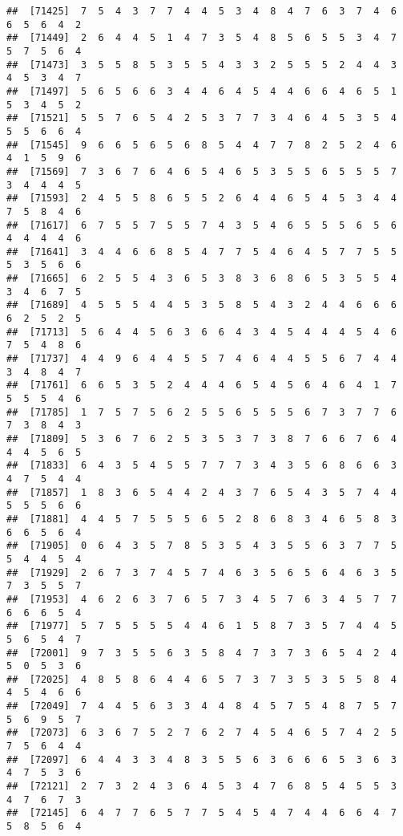 \documentclass[
]{book}
\begin{document}
\begin{verbatim}
##  [71425]  7  5  4  3  7  7  4  4  5  3  4  8  4  7  6  3  7  4  6  6  5  6  4  2
##  [71449]  2  6  4  4  5  1  4  7  3  5  4  8  5  6  5  5  3  4  7  5  7  5  6  4
##  [71473]  3  5  5  8  5  3  5  5  4  3  3  2  5  5  5  2  4  4  3  4  5  3  4  7
##  [71497]  5  6  5  6  6  3  4  4  6  4  5  4  4  6  6  4  6  5  1  5  3  4  5  2
##  [71521]  5  5  7  6  5  4  2  5  3  7  7  3  4  6  4  5  3  5  4  5  5  6  6  4
##  [71545]  9  6  6  5  6  5  6  8  5  4  4  7  7  8  2  5  2  4  6  4  1  5  9  6
##  [71569]  7  3  6  7  6  4  6  5  4  6  5  3  5  5  6  5  5  5  7  3  4  4  4  5
##  [71593]  2  4  5  5  8  6  5  5  2  6  4  4  6  5  4  5  3  4  4  7  5  8  4  6
##  [71617]  6  7  5  5  7  5  5  7  4  3  5  4  6  5  5  5  6  5  6  4  4  4  4  6
##  [71641]  3  4  4  6  6  8  5  4  7  7  5  4  6  4  5  7  7  5  5  5  3  5  6  6
##  [71665]  6  2  5  5  4  3  6  5  3  8  3  6  8  6  5  3  5  5  4  3  4  6  7  5
##  [71689]  4  5  5  5  4  4  5  3  5  8  5  4  3  2  4  4  6  6  6  6  2  5  2  5
##  [71713]  5  6  4  4  5  6  3  6  6  4  3  4  5  4  4  4  5  4  6  7  5  4  8  6
##  [71737]  4  4  9  6  4  4  5  5  7  4  6  4  4  5  5  6  7  4  4  3  4  8  4  7
##  [71761]  6  6  5  3  5  2  4  4  4  6  5  4  5  6  4  6  4  1  7  5  5  5  4  6
##  [71785]  1  7  5  7  5  6  2  5  5  6  5  5  5  6  7  3  7  7  6  7  3  8  4  3
##  [71809]  5  3  6  7  6  2  5  3  5  3  7  3  8  7  6  6  7  6  4  4  4  5  6  5
##  [71833]  6  4  3  5  4  5  5  7  7  7  3  4  3  5  6  8  6  6  3  4  7  5  4  4
##  [71857]  1  8  3  6  5  4  4  2  4  3  7  6  5  4  3  5  7  4  4  5  5  5  6  6
##  [71881]  4  4  5  7  5  5  5  6  5  2  8  6  8  3  4  6  5  8  3  6  6  5  6  4
##  [71905]  0  6  4  3  5  7  8  5  3  5  4  3  5  5  6  3  7  7  5  5  4  4  5  4
##  [71929]  2  6  7  3  7  4  5  7  4  6  3  5  6  5  6  4  6  3  5  7  3  5  5  7
##  [71953]  4  6  2  6  3  7  6  5  7  3  4  5  7  6  3  4  5  7  7  6  6  6  5  4
##  [71977]  5  7  5  5  5  5  4  4  6  1  5  8  7  3  5  7  4  4  5  5  6  5  4  7
##  [72001]  9  7  3  5  5  6  3  5  8  4  7  3  7  3  6  5  4  2  4  5  0  5  3  6
##  [72025]  4  8  5  8  6  4  4  6  5  7  3  7  3  5  3  5  5  8  4  4  5  4  6  6
##  [72049]  7  4  4  5  6  3  3  4  4  8  4  5  7  5  4  8  7  5  7  5  6  9  5  7
##  [72073]  6  3  6  7  5  2  7  6  2  7  4  5  4  6  5  7  4  2  5  7  5  6  4  4
##  [72097]  6  4  4  3  3  4  8  3  5  5  6  3  6  6  6  5  3  6  3  4  7  5  3  6
##  [72121]  2  7  3  2  4  3  6  4  5  3  4  7  6  8  5  4  5  5  3  4  7  6  7  3
##  [72145]  6  4  7  7  6  5  7  7  5  4  5  4  7  4  4  6  6  4  7  5  8  5  6  4

\end{verbatim}
\end{document}
